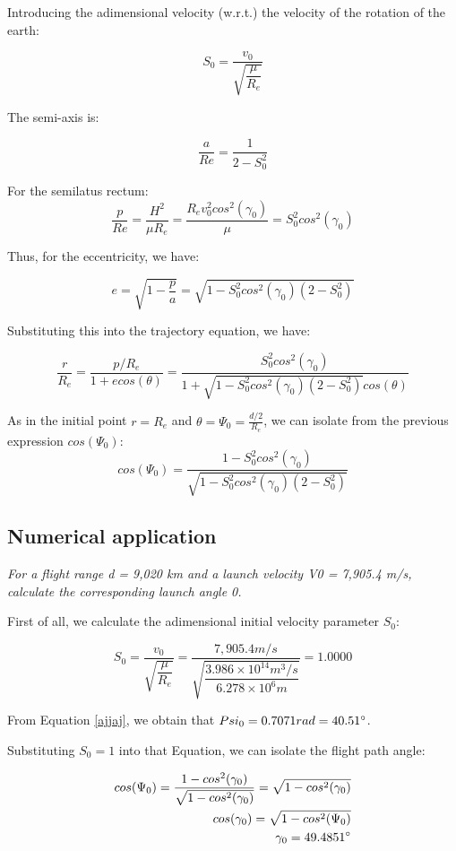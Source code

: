 Introducing the adimensional velocity (w.r.t.) the velocity of the rotation of the earth:

$$ S_0 = \frac{v_0}{\sqrt{\dfrac{\mu}{R_e}}} $$

The semi-axis is: 

\begin{equation}
\frac{a}{Re} = \frac{1}{2-S_0^2}
\end{equation}

For the semilatus rectum: 
\begin{equation}
\frac{p}{Re} = \frac{H^2}{\mu R_e} = \frac{R_ev_0^2cos^2(\gamma_0)}{\mu} = S_0^2 cos^2(\gamma_0)
\end{equation}

Thus, for the eccentricity, we have:

\begin{equation}
	e=\sqrt{1-\frac{p}{a}} = \sqrt{1-S_0^2 cos^2(\gamma_0)(2-S_0^2)}
\end{equation}

Substituting this into the trajectory equation, we have: 

\begin{equation}
\frac{r}{R_e} = \frac{p/R_e}{1+ e cos(\theta)	} = \frac{ S_0^2 cos^2(\gamma_0)}{1 + \sqrt{1-S_0^2 cos^2(\gamma_0)(2-S_0^2)} cos(\theta)}
\end{equation}

As in the initial point $r = R_e$ and $\theta = \Psi_0 = \frac{d/2}{R_e}$, we can isolate from the previous expression $cos(\Psi_0)$:
\begin{equation}
cos(\Psi_0) = \frac{1 - S_0^2 cos^2(\gamma_0)}{\sqrt{1-S_0^2 cos^2(\gamma_0)(2-S_0^2)} }
\label{ajjaj}
\end{equation}

\subsection{Numerical application}

\textit{For a flight range d = 9,020 km and a launch velocity V0 = 7,905.4 m/s, 	calculate the corresponding launch angle 0.}

First of all, we calculate the adimensional initial velocity parameter $S_0$: 

$$ S_0 = \frac{v_0}{\sqrt{\dfrac{\mu}{R_e}}} =\frac{7,905.4 m/s}{\sqrt{\dfrac{3.986\times 10^{14} m^3/s}{6.278 \times 10^6 m}}} = 1.0000 $$

From Equation \ref{ajjaj}, we obtain that $Psi_0 = 0.7071 rad = 40.51 \degree$.

Substituting $S_0 = 1$ into that Equation, we can isolate the flight path angle:

\begin{align}
cos(\Psi_0) = \frac{1 -  cos^2(\gamma_0)}{\sqrt{1-cos^2(\gamma_0)} } = \sqrt{1-cos^2(\gamma_0)} \\
cos(\gamma_0) = \sqrt{1-cos^2(\Psi_0)} \\
\gamma_0 = 49.4851 \degree
\end{align}